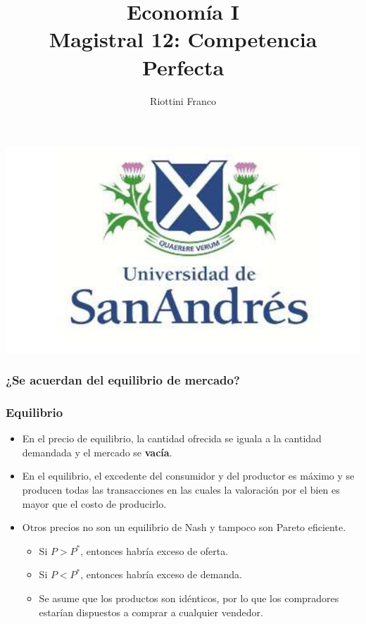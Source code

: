 \documentclass{beamer}
\title[Economía I]{Economía I \vspace{4mm}
\\ Magistral 12: Competencia Perfecta}
\date{}
\author[Franco Riottini]{Riottini Franco}
\institute[]{Universidad de San Andrés}
\begin{document}
\begin{frame}
\titlepage
\centering
\includegraphics[scale=0.2]{../Figures/logoUDESA.jpg} 
\end{frame}

\begin{frame}
\frametitle{¿Se acuerdan del equilibrio de mercado?}
\begin{figure} [H]
\centering
{}
\end{figure} 
\end{frame}

\begin{frame}
\frametitle{Equilibrio}
\begin{itemize}
    \item En el precio de equilibrio, la cantidad ofrecida se iguala a la cantidad demandada y el mercado se \textbf{vacía}.
    \item En el equilibrio, el excedente del consumidor y del productor es máximo y se producen todas las transacciones en las cuales la valoración por el bien es mayor que el costo de producirlo.
    \item Otros precios no son un equilibrio de Nash y tampoco son Pareto eficiente.
    \begin{itemize}
        \item Si $P > P^{*}$, entonces habría exceso de oferta.
        \item Si $P < P^{*}$, entonces habría exceso de demanda.
        \item Se asume que los productos son idénticos, por lo que los compradores estarían dispuestos a comprar a cualquier vendedor.
    \end{itemize}
\end{itemize}
\end{frame}
\end{document}
